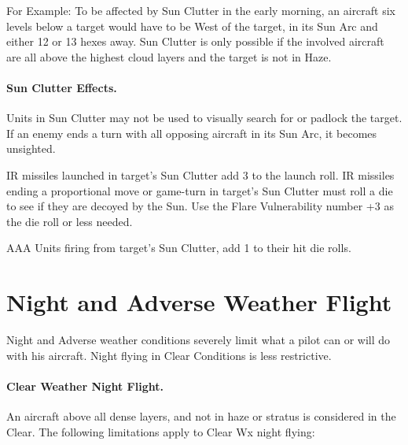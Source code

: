 \begin{advancedrules}


For Example: To be affected by Sun Clutter in the early morning, an aircraft six levels below a target would have to be West of the target, in its Sun Arc and either 12 or 13 hexes away. Sun Clutter is only possible if the involved aircraft are all above the highest cloud layers and the target is not in Haze.

\paragraph{Sun Clutter Effects.} Units in Sun Clutter may not be used to visually search for or padlock the target. If an enemy ends a turn with all opposing aircraft in its Sun Arc, it becomes unsighted.

IR missiles launched in target's Sun Clutter add 3 to the launch roll. IR missiles ending a proportional move or game-turn in target's Sun Clutter must roll a die to see if they are decoyed by the Sun. Use the Flare Vulnerability number +3 as the die roll or less needed.

AAA Units firing from target's Sun Clutter, add 1 to their hit die rolls.

\section{Night and Adverse Weather Flight}
\label{rule:night-and-adverse-weather-flight}
\label{rule:adverse-conditions}

Night and Adverse weather conditions severely limit what a pilot can or will do with his aircraft. Night flying in Clear Conditions is less restrictive.


\paragraph{Clear Weather Night Flight.} An aircraft above all dense layers, and not in haze or stratus is considered in the Clear. The following limitations apply to Clear Wx night flying:


\end{advancedrules}
